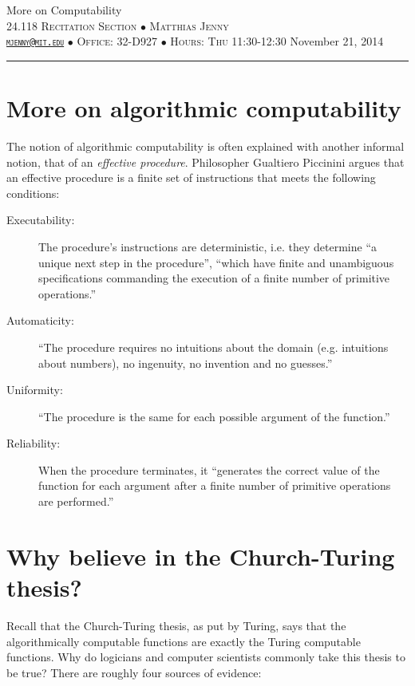 \documentclass[justified]{tufte-handout}
\newcommand{\HRule}{\rule{\linewidth}{0.1mm}}
\begin{document}
\begin{fullwidth}
\noindent\LARGE More on Computability  \normalsize \\[.3cm]
\noindent  \textsc{24.118 Recitation Section $\bullet$ Matthias Jenny\\  {\texttt{\href{mailto:mjenny@mit.edu}{mjenny@mit.edu}}} $\bullet$ Office:  32-D927 $\bullet$ Hours: Thu 11:30-12:30} \hfill{November 21, 2014}
\noindent\HRule
\end{fullwidth}

\section{More on algorithmic computability}

\noindent The notion of algorithmic computability is often explained with another informal notion, that of an \emph{effective procedure}. Philosopher Gual\-tiero Piccinini  argues that an effective procedure is a finite set of instructions that meets the following conditions:

\begin{description}
\item[Executability:] The procedure's instructions are deterministic, i.e. they determine ``a unique next step in the procedure'', ``which have finite and unambiguous specifications commanding the execution of a finite number of primitive operations.''
\item[Automaticity:] ``The procedure requires no intuitions about the domain (e.g. intuitions about numbers), no ingenuity, no invention and no guesses.''
\item[Uniformity:] ``The procedure is the same for each possible argument of the function.''
\item[Reliability:] When the procedure terminates, it ``generates the correct value of the function for each argument after a finite number of primitive operations are performed.''
\end{description}

\section{Why believe in the Church-Turing thesis?}

\noindent Recall that the Church-Turing thesis, as put by Turing, says that the algorithmically computable functions are exactly the Turing computable functions. Why do logicians and computer scientists commonly take this thesis to be true? There are roughly four sources of evidence:
\end{document}
